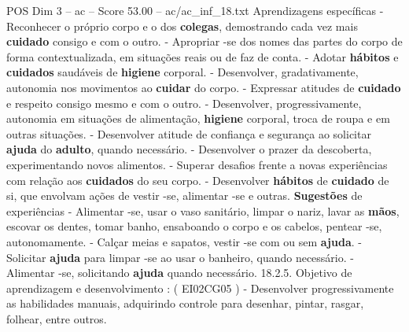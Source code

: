 \begin{textsample}{POS Dim 3 – ac – Score 53.00 – ac/ac\_inf\_18.txt}
Aprendizagens específicas - Reconhecer o próprio corpo e o dos \textbf{colegas}, demostrando cada vez mais \textbf{cuidado} consigo e com o outro. - Apropriar -se dos nomes das partes do corpo de forma contextualizada, em situações reais ou de faz de conta. - Adotar \textbf{hábitos} e \textbf{cuidados} saudáveis de \textbf{higiene} corporal. - Desenvolver, gradativamente, autonomia nos movimentos ao \textbf{cuidar} do corpo. - Expressar atitudes de \textbf{cuidado} e respeito consigo mesmo e com o outro. - Desenvolver, progressivamente, autonomia em situações de alimentação, \textbf{higiene} corporal, troca de roupa e em outras situações. - Desenvolver atitude de confiança e segurança ao solicitar \textbf{ajuda} do \textbf{adulto}, quando necessário. - Desenvolver o prazer da descoberta, experimentando novos alimentos. - Superar desafios frente a novas experiências com relação aos \textbf{cuidados} do seu corpo. - Desenvolver \textbf{hábitos} de \textbf{cuidado} de si, que envolvam ações de vestir -se, alimentar -se e outras. \textbf{Sugestões} de experiências - Alimentar -se, usar o vaso sanitário, limpar o nariz, lavar as \textbf{mãos}, escovar os dentes, tomar banho, ensaboando o corpo e os cabelos, pentear -se, autonomamente. - Calçar meias e sapatos, vestir -se com ou sem \textbf{ajuda}. - Solicitar \textbf{ajuda} para limpar -se ao usar o banheiro, quando necessário. - Alimentar -se, solicitando \textbf{ajuda} quando necessário. 18.2.5.
Objetivo de aprendizagem e desenvolvimento : ( EI02CG05 ) - Desenvolver progressivamente as habilidades manuais, adquirindo controle para desenhar, pintar, rasgar, folhear, entre outros.

\end{textsample}
